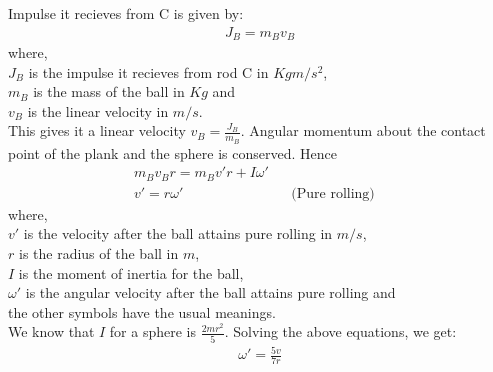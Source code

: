 \documentclass[11pt]{article}
\begin{document}
Impulse it recieves from C is given by:
\begin{align}
J_B = m_B v_B
\end{align}
where,\\
$J_B$ is the impulse it recieves from rod C in $Kg m/s^2$,\\
$m_B$ is the mass of the ball in $Kg$ and\\
$v_B$ is the linear velocity in $m/s$.\\

This gives it a linear velocity $v_B = \frac{J_B}{m_B}$. Angular momentum about the contact point of the plank and the sphere is conserved. Hence
\begin{align}
m_B v_B r = m_B v'r + I\omega '
\\
v' = r\omega ' &&\mbox{(Pure rolling)}&
\end{align}
where,\\
$v'$ is the velocity after the ball attains pure rolling in $m/s$,\\
$r$ is the radius of the ball in $m$,\\
$I$ is the moment of inertia for the ball,\\
$\omega '$ is the angular velocity after the ball attains pure rolling and\\
the other symbols have the usual meanings.\\

We know that $I$ for a sphere is $\frac{2mr^2}{5}$.
Solving the above equations, we get:
\begin{align}
\omega ' = \frac{5v}{7r}
\end{align}

\pagebreak
\end{document}
